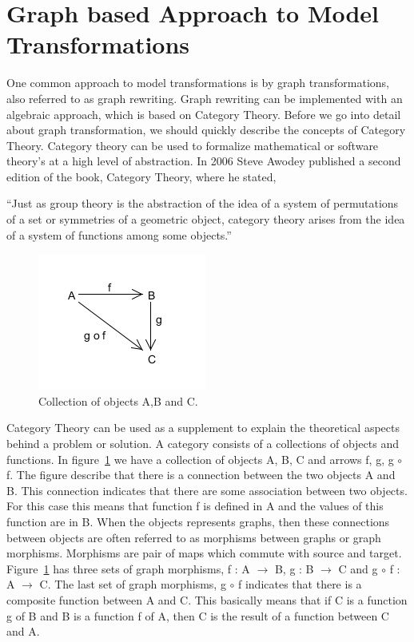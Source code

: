 \section{Graph based Approach to Model Transformations} 
\label{sec:graph_based}

One common approach to model transformations is by graph transformations,
also referred to as graph rewriting. Graph rewriting can be implemented with
an algebraic approach, which is based on Category Theory. Before we go into
detail about graph transformation, we should quickly describe the concepts of
Category Theory\cite{Herrlich1973,Barr1990}. Category theory can be used to
formalize mathematical or software theory's at a high level of abstraction. In
2006 Steve Awodey published a second edition of the book, Category Theory,
where he stated,

``Just as group theory is the abstraction of the idea of a system of
permutations of a set or symmetries of a geometric object, category theory
arises from the idea of a system of functions among some
objects\cite{Awodey2006}.''

\begin{figure}[H]
	\centering
	\includegraphics[scale=0.7]{./Figures/categoryTheory.png}
	\caption[Category Theory]
	{Collection of objects A,B and C.}
	\label{fig:categoryTheory}
\end{figure}

Category Theory can be used as a supplement to explain the theoretical aspects
behind a problem or solution. A category consists of a collections of
objects and functions. In figure~\ref{fig:categoryTheory} we have a collection
of objects A, B, C and arrows f, g, g $\circ$ f. The figure describe that
there is a connection between the two objects A and B. This connection
indicates that there are some association between two objects. For this case
this means that function f is defined in A and the values of this function are
in B. When the objects represents graphs, then these connections between objects
are often referred to as morphisms between graphs or graph morphisms. Morphisms
are pair of maps which commute with source and target\cite{Brown2008}.
Figure~\ref{fig:categoryTheory} has three sets of graph morphisms, f : A
$\longrightarrow$ B, g : B $\longrightarrow$ C and g $\circ$ f : A
$\longrightarrow$ C. The last set of graph morphisms, g $\circ$ f indicates that
there is a composite function between A and C. This basically means that if
C is a function g of B and B is a function f of A, then C is the result of a
function between C and A. 

